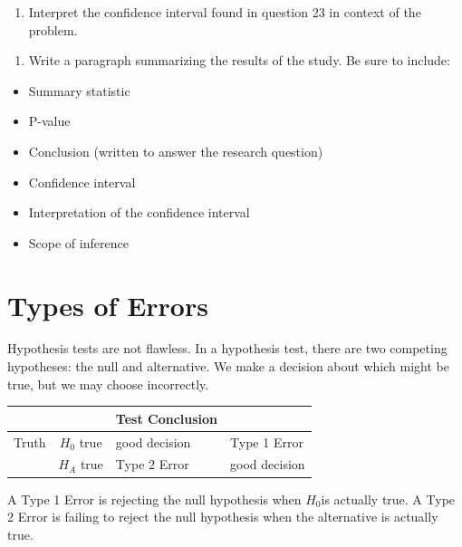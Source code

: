\documentclass[
]{report}
\providecommand{\tightlist}{%
  \setlength{\itemsep}{0pt}\setlength{\parskip}{0pt}}
\begin{document}
\vspace{1in}

\begin{enumerate}
\def\labelenumi{\arabic{enumi}.}
\setcounter{enumi}{23}
\tightlist
\item
  Interpret the confidence interval found in question 23 in context of the problem.
\end{enumerate}

\vspace{1in}

\begin{enumerate}
\def\labelenumi{\arabic{enumi}.}
\setcounter{enumi}{24}
\tightlist
\item
  Write a paragraph summarizing the results of the study. Be sure to include:
\end{enumerate}

\begin{itemize}
\item
  Summary statistic
\item
  P-value
\item
  Conclusion (written to answer the research question)
\item
  Confidence interval
\item
  Interpretation of the confidence interval
\item
  Scope of inference
\end{itemize}

\vspace{3in}

\hypertarget{types-of-errors}{%
\section{Types of Errors}\label{types-of-errors}}

Hypothesis tests are not flawless. In a hypothesis test, there are two competing hypotheses: the null and alternative. We make a decision about which might be true, but we may choose incorrectly.

\begin{longtable}[]{@{}ccll@{}}
\toprule
& & Test Conclusion &\tabularnewline
\midrule
\endhead
Truth & \(H_0\) true & good decision & Type 1 Error\tabularnewline
& \(H_A\) true & Type 2 Error & good decision\tabularnewline
\bottomrule
\end{longtable}

A Type 1 Error is rejecting the null hypothesis when \(H_0\)is actually true. A Type 2 Error is failing to reject the null hypothesis when the alternative is actually true.
\end{document}
